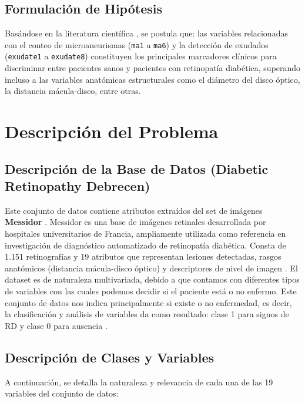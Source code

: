 \subsection{Formulación de Hipótesis}

Basándose en la literatura científica \parencite{casanova2014application}, se postula que: las variables relacionadas con el conteo de microaneurismas (\texttt{ma1} a
  \texttt{ma6}) y la detección de exudados (\texttt{exudate1} a \texttt{exudate8}) constituyen los principales marcadores clínicos para discriminar entre pacientes sanos y         
  pacientes con retinopatía diabética, superando incluso a las variables anatómicas estructurales como el diámetro del disco óptico, la distancia mácula-disco, entre otras.

\section{Descripción del Problema}

\subsection{Descripción de la Base de Datos (Diabetic Retinopathy Debrecen)}

Este conjunto de datos contiene atributos extraídos del set de imágenes \textbf{Messidor} \parencite{antal2014dataset}. Messidor es una base de imágenes retinales desarrollada por hospitales universitarios de Francia, ampliamente utilizada como referencia en investigación de diagnóstico automatizado de retinopatía diabética. Consta de 1.151 retinografías y 19 atributos que representan lesiones detectadas, rasgos anatómicos (distancia mácula-disco óptico) y descriptores de nivel de imagen \parencite{antal2014dataset}. El dataset es de naturaleza multivariada, debido a que contamos con diferentes tipos de variables con las cuales podemos decidir si el paciente está o no enfermo. Este conjunto de datos nos indica principalmente si existe o no enfermedad, es decir, la clasificación y análisis de variables da como resultado: clase 1 para signos de RD y clase 0 para ausencia \parencite{antal2014dataset}.

\subsection{Descripción de Clases y Variables}

A continuación, se detalla la naturaleza y relevancia de cada una de las 19 variables del conjunto de datos:

